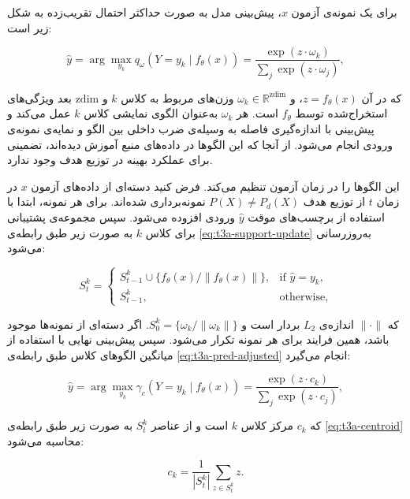 برای یک نمونه‌ی آزمون \(x\)، پیش‌بینی مدل به صورت حداکثر احتمال تقریب‌زده به شکل زیر است:

\begin{equation}
	\hat{y} = \arg\max_{y_k} q_\omega(Y = y_k \mid f_\theta(x)) 
	= \frac{\exp(z \cdot \omega_k)}{\sum_j \exp(z \cdot \omega_j)},
	\label{eq:t3a-pred}
\end{equation}

که در آن \(z = f_\theta(x)\)، و \(\omega_k \in \mathbb{R}^{\text{zdim}}\) وزن‌های مربوط به کلاس \(k\) و \(\text{zdim}\) بعد ویژگی‌های استخراج‌شده توسط \(f_\theta\) است. 
هر \(\omega_k\) به‌عنوان الگوی نمایشی کلاس \(k\) عمل می‌کند و پیش‌بینی با اندازه‌گیری فاصله به وسیله‌ی ضرب داخلی بین الگو و نمایه‌ی نمونه‌ی ورودی انجام می‌شود. از آنجا که این الگوها در داده‌های منبع آموزش دیده‌اند، تضمینی برای عملکرد بهینه در توزیع هدف وجود ندارد.

 این الگوها را در زمان آزمون تنظیم می‌کند. فرض کنید دسته‌ای از داده‌های آزمون \(x\) در زمان \(t\) از توزیع هدف \(P(X) \neq P_d(X)\) نمونه‌برداری شده‌اند. برای هر نمونه، ابتدا با استفاده از برچسب‌های موقت \(\hat{y}\) ورودی افزوده می‌شود. سپس {مجموعه‌ی پشتیبانی} برای کلاس \(k\) به صورت زیر طبق رابطه‌ی \ref{eq:t3a-support-update} \cite{t3a}به‌روزرسانی می‌شود:

\begin{equation}
	S^k_t = 
	\begin{cases}
		S^k_{t-1} \cup \{f_\theta(x) / \|f_\theta(x)\|\}, & \text{if } \hat{y} = y_k,\\
		S^k_{t-1}, & \text{otherwise},
	\end{cases}
	\label{eq:t3a-support-update}
\end{equation}

که \(\|\cdot\|\) اندازه‌ی \(L_2\) بردار است و \(S^k_0 = \{\omega_k / \|\omega_k\|\}\). اگر دسته‌ای از نمونه‌ها موجود باشد، همین فرایند برای هر نمونه تکرار می‌شود. سپس پیش‌بینی نهایی با استفاده از میانگین الگوهای کلاس طبق رابطه‌ی \ref{eq:t3a-pred-adjusted} انجام می‌گیرد\cite{t3a}:

\begin{equation}
	\hat{y} = \arg\max_{y_k} \gamma_c(Y = y_k \mid f_\theta(x)) 
	= \frac{\exp(z \cdot c_k)}{\sum_j \exp(z \cdot c_j)},
	\label{eq:t3a-pred-adjusted}
\end{equation}

که \(c_k\) مرکز کلاس \(k\) است و از عناصر \(S^k_t\) به صورت زیر طبق رابطه‌ی \ref{eq:t3a-centroid} محاسبه می‌شود\cite{t3a}:

\begin{equation}
	c_k = \frac{1}{|S^k_t|} \sum_{z \in S^k_t} z.
	\label{eq:t3a-centroid}
\end{equation}

